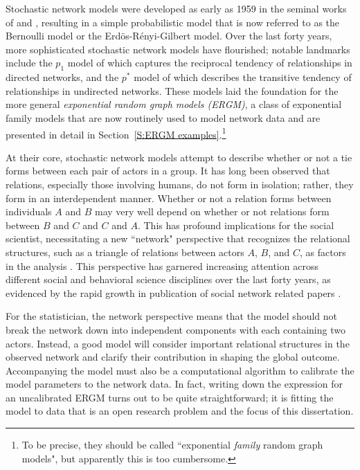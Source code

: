 Stochastic network models were developed as early as 1959 in the seminal works of 
\citet{Gilbert} and \citet{Erdos}, resulting in a simple probabilistic model that is 
now referred to as the Bernoulli model or the Erd\"{o}s-R\'{e}nyi-Gilbert model.  Over 
the last forty years, more sophisticated stochastic network models have flourished;  
notable landmarks include the $p_1$ model of \citet{Holland:1981} which captures the 
reciprocal tendency of relationships in directed networks, and the $p^*$ model of 
\citet{Frank:1986} which describes the transitive tendency of relationships in 
undirected networks.  These models laid the foundation for the more general 
\emph{exponential random graph models (ERGM)}, a class of exponential family 
models that are now routinely used to model network data and are presented in 
detail in Section~\ref{S:ERGM examples}.\footnote{To be precise, they should
be called ``exponential \emph{family} random graph models", but apparently
this is too cumbersome.} 

At their core, stochastic network models attempt to describe whether or not a tie 
forms between each pair of actors in a group.
It has long been observed that relations, especially those involving humans, do not 
form in isolation; rather, they form in an interdependent manner.  Whether or not a 
relation forms between individuals $A$ and $B$ may very well depend on whether or not 
relations form between $B$ and $C$ and $C$ and $A$.  This has profound implications 
for the social scientist, necessitating a new ``network" perspective that recognizes 
the relational structures, such as a triangle of relations between actors $A$, $B$, 
and $C$, as factors in the analysis \citep[Chapter 1]{Wasserman:1994}.  This perspective has 
garnered increasing attention across different social and behavioral science 
disciplines over the last forty years, as evidenced by the rapid growth in publication 
of social network related papers \citep[Chapter 1]{Knoke:2008}.
  
For the statistician, the network perspective means that the model should not break the 
network down into independent components with each containing two actors.
Instead, a good model will consider important relational structures in the observed network 
and clarify their contribution in shaping the global outcome.   
Accompanying the model must also be a computational algorithm to calibrate the model 
parameters to the network data.  
In fact, writing down the expression for an uncalibrated ERGM turns out to be quite
straightforward; it is fitting the model
to data that is an open research problem and the focus of this dissertation.

